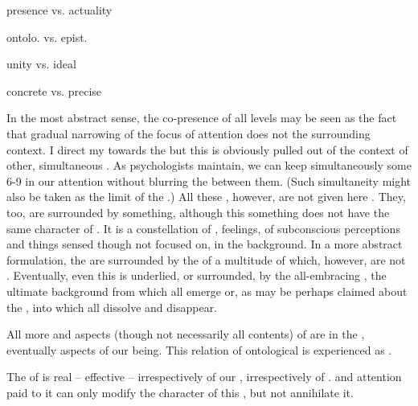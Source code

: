 {  
  presence vs. actuality
  
  ontolo. vs. epist.
  
  unity vs. ideal
  
  concrete vs. precise

  
  \label{sub:copresence}

  \pa In the most abstract sense, the co-presence of all levels may be seen as
  the fact that gradual narrowing of the focus of attention does not
   the surrounding context.  I direct my  towards the
   but this  is obviously pulled out of the context
  of other, simultaneous .  As psychologists maintain, we can keep
  simultaneously some 6-9  in our attention without blurring the
   between them.  (Such simultaneity might also be taken as the
  limit of the \hoa.)  All these , however, are not given here
  .  They, too, are surrounded by something, although this
  something does not have the same character of .  It is
  a constellation of , feelings, of subconscious perceptions and
  things sensed though not focused on, in the background.  In a more abstract
  formulation, the  are surrounded by the  of a
  multitude of  which, however, are not .
  Eventually, even this  is underlied, or surrounded, by the
  all-embracing , the ultimate background from which all
   emerge or, as may be perhaps claimed about the , into which all dissolve and disappear.

  
  \pa All more  and  aspects (though not necessarily all
  contents) of  are  in the ,
  eventually  aspects of our being. This relation of ontological
   is experienced as .
  
  The  of  is real -- effective -- irrespectively of
  our , irrespectively of .
   and attention paid to it can only modify the character of this
  , but not annihilate it.
  
}
